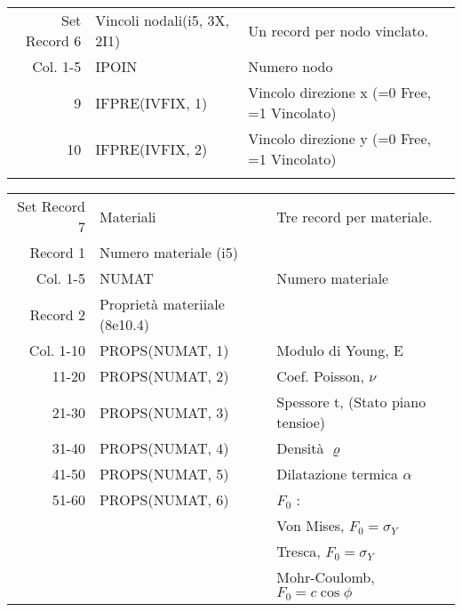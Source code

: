 \begin{tabular}{rll}
	Set Record 6 & Vincoli nodali(i5, 3X, 2I1)    & Un record per nodo vinclato.                      \\
	Col. 1-5     & IPOIN                          & Numero nodo                                       \\
	9     & IFPRE(IVFIX, 1)                & Vincolo direzione x (=0 Free, =1 Vincolato)       \\
	10     & IFPRE(IVFIX, 2)                & Vincolo direzione y (=0 Free, =1 Vincolato)       \\
	&                                &                                                   \\	             
\end{tabular}

\begin{tabular}{rll}
	Set Record 7 & Materiali                      & Tre record per materiale.                         \\
	Record 1     & Numero materiale (i5)          &                                                   \\
	Col. 1-5     & NUMAT                          & Numero materiale                                  \\
	Record 2     & Proprietà materiiale (8e10.4)  &                                                   \\
	Col. 1-10    & PROPS(NUMAT, 1)                & Modulo di Young, E                                \\
	11-20    & PROPS(NUMAT, 2)                & Coef. Poisson, $\nu$                              \\
	21-30    & PROPS(NUMAT, 3)                & Spessore t, (Stato piano tensioe)                 \\
	31-40    & PROPS(NUMAT, 4)                & Densità $\varrho$                                 \\
	41-50    & PROPS(NUMAT, 5)                & Dilatazione termica $\alpha$                      \\
	51-60    & PROPS(NUMAT, 6)                & $F_0$ :                                           \\
	&                                & Von Mises, $F_0=\sigma_Y$                         \\
	&                                & Tresca,    $F_0=\sigma_Y$                         \\
	&                                & Mohr-Coulomb, $F_0=c \cos \phi$                   \\

\end{tabular}
